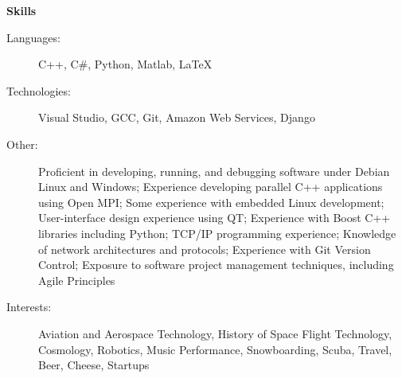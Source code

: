 \documentclass[letterpaper,11pt]{article}
\newcommand{\resheading}[1]{{\large \colorbox{mygrey}{\begin{minipage}{\textwidth}{\textbf{#1 \vphantom{p\^{E}}}}\end{minipage}}}}
\begin{document}
\resheading{Skills}
	\begin{description}
		\item[Languages:] { \footnotesize C++, C\#, Python, Matlab, \LaTeX}
		\item[Technologies:] { \footnotesize Visual Studio, GCC, Git, Amazon Web Services, Django} 
		\item[Other:] { \footnotesize Proficient in developing, running, and debugging software under Debian Linux and Windows; Experience developing parallel C++ applications using Open MPI; Some experience with embedded Linux development; User-interface design experience using QT; Experience with Boost C++ libraries including Python; TCP/IP programming experience; Knowledge of network architectures and protocols; Experience with Git Version Control; Exposure to software project management techniques, including Agile Principles}
		\item[Interests:] { \footnotesize Aviation and Aerospace Technology, History of Space Flight Technology, Cosmology, Robotics, Music Performance, Snowboarding, Scuba, Travel, Beer, Cheese, Startups }
	\end{description} %
	
\end{document}
